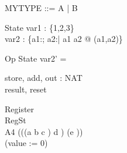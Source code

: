 \documentclass{llncs}
\begin{document}
\begin{zed}
MYTYPE ::= A | B\ldata \nat \cross \nat \rdata \\
\end{zed}
\begin{schema}{State}
var1 : \power \{1,2,3\}\\
var2 : \{a1:\nat; a2:\nat | a1 \neq a2 @ (a1,a2)\}
\end{schema}
\begin{schema}{Op}
\Delta State
\where
var2' = \emptyset
\end{schema}


\begin{circus}
\circchannel store, add, out : NAT\\
\circchannel result, reset\\
\end{circus}
\begin{circus}
\circprocess Register \circdef\\
	\circbegin \circstate RegSt \\
	A4 \circdef (((a \then b \then c \then \Skip) \extchoice d \then \Skip) \circseq (e \then \Skip))\\
	\circspot (value := 0) \\
	\circend\\
\end{circus}
\end{document}
